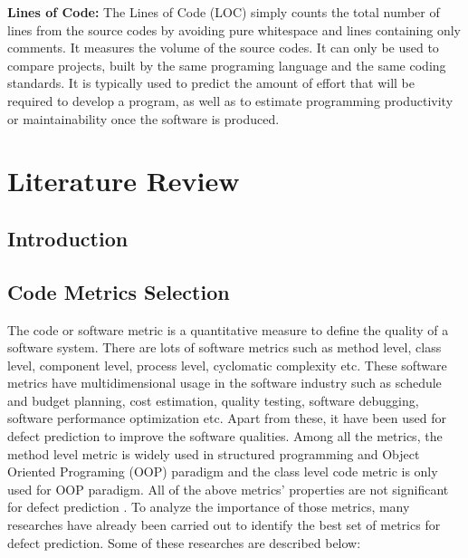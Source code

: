\documentclass[12pt]{report}
\begin{document}
\textbf{Lines of Code:}
The Lines of Code (LOC) simply counts the total number of lines from the source codes by avoiding pure whitespace and lines containing only comments. It measures the volume of the source codes. It can only be used to compare projects, built by the same programing language and the same coding standards. It is typically used to predict the amount of effort that will be required to develop a program, as well as to estimate programming productivity or maintainability once the software is produced.

\chapter{Literature Review}
\section{Introduction}
\section{Code Metrics Selection}
    
The code or software metric is a quantitative measure to define the quality of a software system. There are lots of software metrics such as method level, class level, component level, process level, cyclomatic complexity etc. 
These software metrics have multidimensional usage in the software industry such as schedule and budget planning, cost estimation, quality testing, software debugging, software performance optimization etc. Apart from these, it have been used for defect prediction to improve the software qualities. Among all the metrics, the method level metric is widely used in structured programming and Object Oriented Programing (OOP) paradigm and the class level code metric is only used for OOP paradigm. All of the above metrics' properties are not significant for defect prediction \cite{catal2009systematic,pai2007empirical,zhou2006empirical}. To analyze the importance of those metrics, many researches have already been carried out to identify the best set of metrics for defect prediction. Some of these researches are described below:
 
\end{document}
